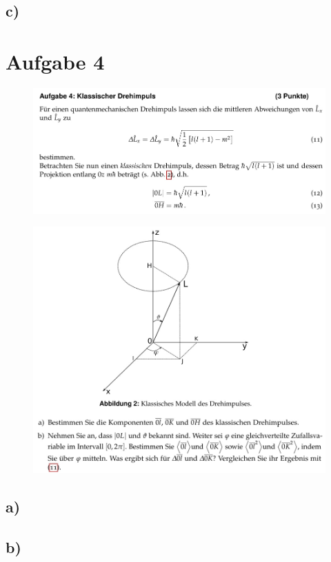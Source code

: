     \subsection{c)}

\section{Aufgabe 4}

    \begin{figure}[H]
        \centering
        \includegraphics[width=\textwidth]{images/Aufgabe4a.jpg}
        \label{fig:6}
    \end{figure}

    \begin{figure}[H]
        \centering
        \includegraphics[width=\textwidth]{images/Aufgabe4b.jpg}
        \label{fig:7}
    \end{figure}

    \subsection{a)}

    \subsection{b)}









